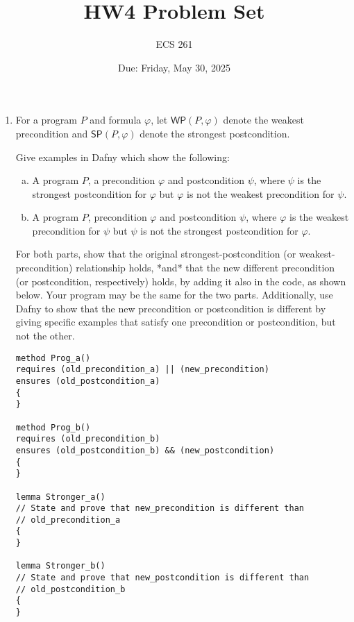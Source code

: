 \documentclass{article}
\renewcommand{\wp}{\mathsf{WP}}
\renewcommand{\sp}{\mathsf{SP}}
\begin{document}
\title{HW4 Problem Set}
\author{ECS 261}
\date{Due: Friday, May 30, 2025}

\maketitle

\begin{enumerate}
\item
For a program $P$ and formula $\varphi$,
let $\wp(P, \varphi)$ denote the weakest precondition and
$\sp(P, \varphi)$ denote the strongest postcondition.

Give examples in Dafny which show the following:
\begin{enumerate}[(a)]
\item A program $P$, a precondition $\varphi$ and postcondition $\psi$,
where $\psi$ is the strongest postcondition for $\varphi$ but $\varphi$ is not the weakest precondition for $\psi$.
\item A program $P$, precondition $\varphi$ and postcondition $\psi$,
where $\varphi$ is the weakest precondition for $\psi$ but $\psi$ is not the strongest postcondition for $\varphi$.
\end{enumerate}

For both parts, show that the original strongest-postcondition (or weakest-precondition) relationship holds, *and* that the new different precondition (or postcondition, respectively) holds, by adding it also in the code, as shown below.
Your program may be the same for the two parts.
Additionally, use Dafny to show that the new precondition or postcondition is different
by giving specific examples that satisfy one precondition or postcondition, but not the other.

\begin{verbatim}
method Prog_a()
requires (old_precondition_a) || (new_precondition)
ensures (old_postcondition_a)
{
}

method Prog_b()
requires (old_precondition_b)
ensures (old_postcondition_b) && (new_postcondition)
{
}

lemma Stronger_a()
// State and prove that new_precondition is different than
// old_precondition_a
{
}

lemma Stronger_b()
// State and prove that new_postcondition is different than
// old_postcondition_b
{
}
\end{verbatim}


\end{enumerate}
\end{document}
